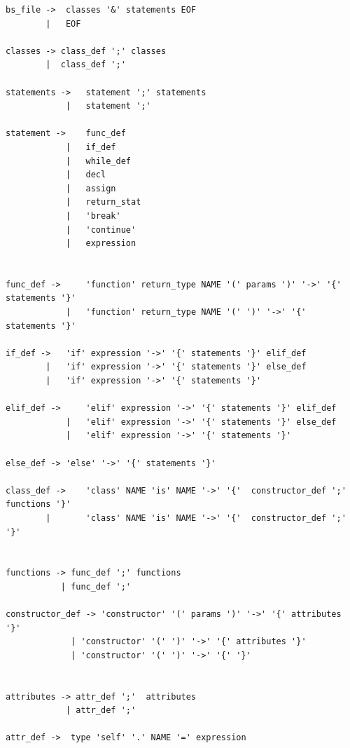 \begin{verbatim}
bs_file ->  classes '&' statements EOF     
        |   EOF                       

classes -> class_def ';' classes         
        |  class_def ';'                       

statements ->   statement ';' statements      
            |   statement ';'                      

statement ->    func_def
            |   if_def
            |   while_def
            |   decl 
            |   assign 
            |   return_stat 
            |   'break'                            
            |   'continue'                         
            |   expression


func_def ->     'function' return_type NAME '(' params ')' '->' '{' statements '}'       
            |   'function' return_type NAME '(' ')' '->' '{' statements '}'              

if_def ->   'if' expression '->' '{' statements '}' elif_def                             
        |   'if' expression '->' '{' statements '}' else_def                             
        |   'if' expression '->' '{' statements '}'                                      

elif_def ->     'elif' expression '->' '{' statements '}' elif_def                       
            |   'elif' expression '->' '{' statements '}' else_def                       
            |   'elif' expression '->' '{' statements '}'                                

else_def -> 'else' '->' '{' statements '}'                                               

class_def ->    'class' NAME 'is' NAME '->' '{'  constructor_def ';' functions '}'   
        |       'class' NAME 'is' NAME '->' '{'  constructor_def ';' '}'                     


functions -> func_def ';' functions                     
           | func_def ';'                               

constructor_def -> 'constructor' '(' params ')' '->' '{' attributes '}'              
             | 'constructor' '(' ')' '->' '{' attributes '}'                 
             | 'constructor' '(' ')' '->' '{' '}'                        


attributes -> attr_def ';'  attributes             
            | attr_def ';'                        

attr_def ->  type 'self' '.' NAME '=' expression           



\end{verbatim}
